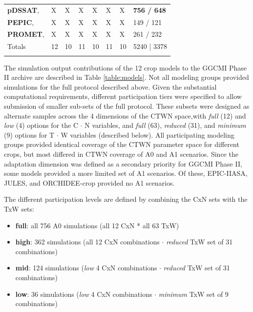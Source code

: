 \documentclass[gmd, manuscript]{copernicus} %
\begin{document}
\begin{table}[t]
\begin{tabular}{p{6cm} p{1cm} p{1cm} p{1cm} p{1cm} p{1cm} p{1cm} p{1.9cm}}
    {\textbf{pDSSAT},       \citet{Elliott2014b, JONES2003235}} & {X} & {X} & {X} & {X} & {X} & {X} & {\textbf{756 / 648}}\\ \middlehline
    {\textbf{PEPIC},        \citet{LIU2016164, LIU2016}}  & {X} & {X} & {X} & {X} & {X} & {X} & {149 / 121}\\ \middlehline
    {\textbf{PROMET},       \citet{Hank2015, MAUSER2015}} & {X} & {X} & {X} & {X} & {X} & {X} & {261 / 232}\\ \middlehline
    {Totals} & {12} & {10} & {11} & {10} & {11} & {10} & {5240 | 3378}\\
    \bottomhline
  \end{tabular}
\end{table}

The simulation output contributions of the 12 crop models to the GGCMI Phase II archive are described in Table \ref{table:models}.
Not all modeling groups provided simulations for the full protocol described above. 
Given the substantial computational requirements, different participation tiers were specified to allow submission of smaller sub-sets of the full protocol. 
These subsets were designed as alternate samples across the 4 dimensions of the CTWN space,with \textit{full} (12) and \textit{low} (4) options for the C $\cdot$ N variables, and \textit{full} (63), \textit{reduced} (31), and \textit{minimum} (9) options for T $\cdot$ W variables (described below). 
All participating modeling groups provided identical coverage of the CTWN parameter space for different crops, but most differed in CTWN coverage of A0 and A1 scenarios. Since the adaptation dimension was defined as a secondary priority for GGCMI Phase II, some models provided a more limited set of A1 scenarios. Of these, EPIC-IIASA, JULES, and ORCHIDEE-crop provided no A1 scenarios.

The different participation levels are defined by combining the CxN sets with the TxW sets:
\begin{itemize}
  \item{\textbf{full}: all 756 A0 simulations (all 12 CxN * all 63 TxW)}
  \item{\textbf{high}: 362 simulations (all 12 CxN combinations  $\cdot$ \textit{reduced} TxW set of 31 combinations)}
  \item{\textbf{mid}: 124 simulations (\textit{low} 4 CxN combinations $\cdot$ \textit{reduced} TxW set of 31 combinations)}
  \item{\textbf{low}: 36 simulations (\textit{low} 4 CxN combinations $\cdot$ \textit{minimum} TxW set of 9 combinations)}
\end{itemize}
\end{document}
